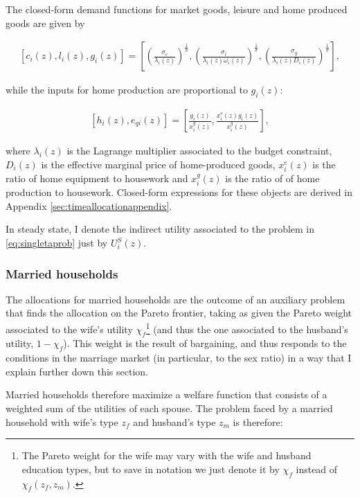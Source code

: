 \documentclass[12pt]{article}
\begin{document}
The closed-form demand functions for market goods, leisure and home produced goods are given by

\begin{align*}
	\left[c_i(z),l_i(z),g_i(z)\right] = \left[\left(\frac{\sigma_c}{\lambda_i(z)}\right)^{\frac{1}{\sigma}},\left(\frac{\sigma_l}{\lambda_i(z)\omega_i(z)}\right)^{\frac{1}{\sigma}},\left(\frac{\sigma_g}{\lambda_i(z) D_i(z)}\right)^{\frac{1}{\sigma}}\right],
\end{align*}

while the inputs for home production are proportional to $g_i(z)$:

\begin{align*}
	\left[h_i(z),e_{qi}(z)\right] = \left[\frac{g_i(z)}{x^g_i(z)}, \frac{x^e_i(z) g_i(z)}{x^g_i(z)}\right],
\end{align*}

where $\lambda_i(z)$ is the Lagrange multiplier associated to the budget constraint, $D_i(z)$ is the effective marginal price of home-produced goods, $x^e_i(z)$ is the ratio of home equipment to housework  and $x^g_i(z)$ is the ratio of of home production to housework. Closed-form expressions for these objects are derived in Appendix \ref{sec:timeallocationappendix}. 

In steady state, I denote the indirect utility associated to the problem in \ref{eq:singletaprob} just by $U_i^S\left(z\right)$.

\subsubsection{Married households}

The allocations for married households are the outcome of an auxiliary problem that finds the allocation on the Pareto frontier, taking as given the Pareto weight associated to the wife's utility $\chi_f$\footnote{The Pareto weight for the wife may vary with the wife and husband education types, but to save in notation we just denote it by $\chi_f$ instead of $\chi_f\left(z_f,z_m\right)$.} (and thus the one associated to the husband's utility, $1-\chi_f$). This weight is the result of bargaining, and thus responds to the conditions in the marriage market (in particular, to the sex ratio) in a way that I explain further down this section.   

Married households therefore maximize a welfare function that consists of a weighted sum of the utilities of each spouse. The problem faced by a married household with wife's type $z_f$ and husband's type $z_m$ is therefore:
\end{document}
